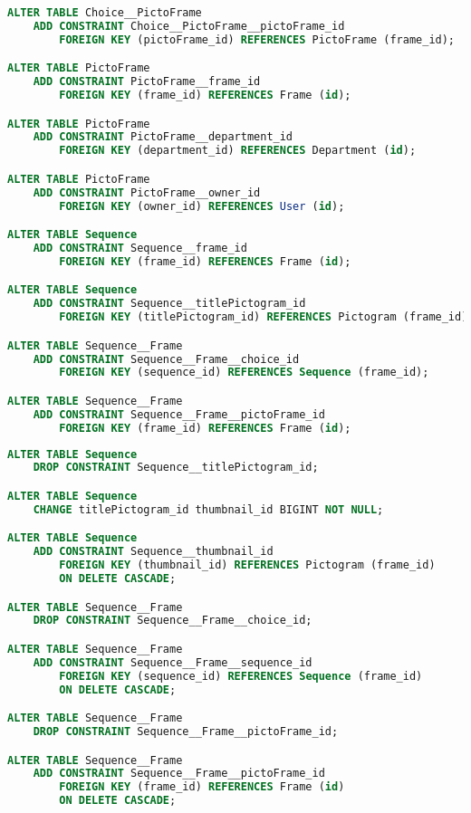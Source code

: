 \begin{lstlisting}[language=sql]
ALTER TABLE Choice__PictoFrame
    ADD CONSTRAINT Choice__PictoFrame__pictoFrame_id
        FOREIGN KEY (pictoFrame_id) REFERENCES PictoFrame (frame_id);

ALTER TABLE PictoFrame
    ADD CONSTRAINT PictoFrame__frame_id
        FOREIGN KEY (frame_id) REFERENCES Frame (id);

ALTER TABLE PictoFrame
    ADD CONSTRAINT PictoFrame__department_id
        FOREIGN KEY (department_id) REFERENCES Department (id);

ALTER TABLE PictoFrame
    ADD CONSTRAINT PictoFrame__owner_id
        FOREIGN KEY (owner_id) REFERENCES User (id);

ALTER TABLE Sequence
    ADD CONSTRAINT Sequence__frame_id
        FOREIGN KEY (frame_id) REFERENCES Frame (id);

ALTER TABLE Sequence
    ADD CONSTRAINT Sequence__titlePictogram_id
        FOREIGN KEY (titlePictogram_id) REFERENCES Pictogram (frame_id);

ALTER TABLE Sequence__Frame
    ADD CONSTRAINT Sequence__Frame__choice_id
        FOREIGN KEY (sequence_id) REFERENCES Sequence (frame_id);

ALTER TABLE Sequence__Frame
    ADD CONSTRAINT Sequence__Frame__pictoFrame_id
        FOREIGN KEY (frame_id) REFERENCES Frame (id);
\end{lstlisting}

\begin{lstlisting}[language=sql]
ALTER TABLE Sequence
    DROP CONSTRAINT Sequence__titlePictogram_id;

ALTER TABLE Sequence
    CHANGE titlePictogram_id thumbnail_id BIGINT NOT NULL;

ALTER TABLE Sequence
    ADD CONSTRAINT Sequence__thumbnail_id
        FOREIGN KEY (thumbnail_id) REFERENCES Pictogram (frame_id)
        ON DELETE CASCADE;

ALTER TABLE Sequence__Frame
    DROP CONSTRAINT Sequence__Frame__choice_id;

ALTER TABLE Sequence__Frame
    ADD CONSTRAINT Sequence__Frame__sequence_id
        FOREIGN KEY (sequence_id) REFERENCES Sequence (frame_id)
        ON DELETE CASCADE;

ALTER TABLE Sequence__Frame
    DROP CONSTRAINT Sequence__Frame__pictoFrame_id;

ALTER TABLE Sequence__Frame
    ADD CONSTRAINT Sequence__Frame__pictoFrame_id
        FOREIGN KEY (frame_id) REFERENCES Frame (id)
        ON DELETE CASCADE;
\end{lstlisting}